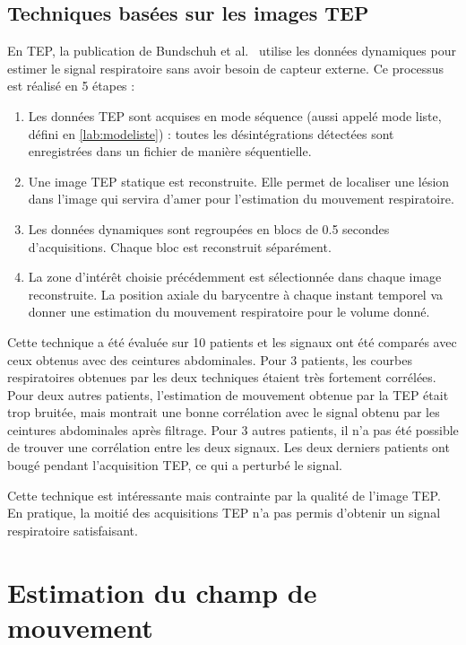 \subsection{Techniques basées sur les images TEP}
\label{lab:estimMvtTEP}
En TEP, la publication de Bundschuh et al.~\cite{bundschuh2007postacquisition} utilise les données dynamiques pour estimer le signal respiratoire sans avoir besoin de capteur externe. Ce processus est réalisé en 5 étapes : 

\begin{enumerate}
 \item Les données TEP sont acquises en mode séquence (aussi appelé mode liste, défini en \ref{lab:modeliste}) : toutes les désintégrations détectées sont enregistrées dans un fichier de manière séquentielle.
 \item Une image TEP statique est reconstruite. Elle permet de localiser une lésion dans l'image qui servira d'amer pour l'estimation du mouvement respiratoire.
 \item Les données dynamiques sont regroupées en blocs de 0.5 secondes d'acquisitions. Chaque bloc est reconstruit séparément. 
 \item La zone d'intérêt choisie précédemment est sélectionnée dans chaque image reconstruite. La position axiale du barycentre à chaque instant temporel va donner une estimation du mouvement respiratoire pour le volume donné.
\end{enumerate}

Cette technique a été évaluée sur 10 patients et les signaux ont été comparés avec ceux obtenus avec des ceintures abdominales. Pour 3 patients, les courbes respiratoires obtenues par les deux techniques étaient très fortement corrélées. Pour deux autres patients, l'estimation de mouvement obtenue par la TEP était trop bruitée, mais montrait une bonne corrélation avec le signal obtenu par les ceintures abdominales après filtrage. Pour 3 autres patients, il n'a pas été possible de trouver une corrélation entre les deux signaux. Les deux derniers patients ont bougé pendant l'acquisition TEP, ce qui a perturbé le signal.

Cette technique est intéressante mais contrainte par la qualité de l'image TEP. En pratique, la moitié des acquisitions TEP n'a pas permis d'obtenir un signal respiratoire satisfaisant.


\section{Estimation du champ de mouvement}
\label{lab:estimChamp}

